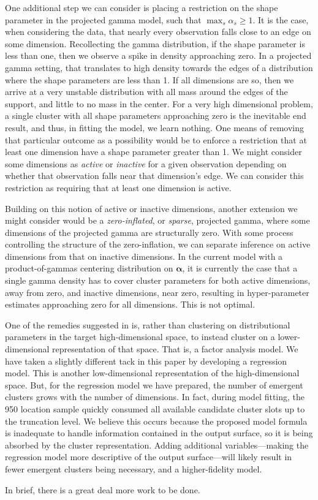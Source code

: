 One additional step we can consider is placing a restriction on the shape parameter in the projected
    gamma model, such that $\max_s \alpha_s \geq 1$.  It is the case, when considering the data, that
    nearly every observation falls close to an edge on some dimension.
    Recollecting the gamma distribution, if the shape 
    parameter is less than one, then we observe a spike in density approaching zero.  In a projected 
    gamma setting, that translates to high density towards the edges of a distribution 
    where the shape parameters are less than 1.  If all dimensions are so, then we arrive at a very 
    unstable distribution with all mass around the edges of the support, and little to no mass in the 
    center.  For a very high dimensional problem, a single cluster with all shape parameters
    approaching zero is the inevitable end result, and thus, in fitting the model, we learn nothing.
    One means of removing that particular outcome as a possibility would be to enforce a restriction 
    that at least one dimension have a shape parameter greater than 1. 
    We might consider some dimensions as \emph{active} or \emph{inactive} for a given observation
    depending on whether that observation falls near that dimension's edge.  We can consider this
    restriction as requiring that at least one dimension is active.

Building on this notion of active or inactive dimensions, another extension we might consider would be
    a \emph{zero-inflated}, or \emph{sparse}, projected gamma, where some dimensions of the projected 
    gamma are structurally zero.  With some process controlling the structure of the zero-inflation,
    we can separate inference on active dimensions from that on inactive dimensions.  In the current model
    with a product-of-gammas centering distribution on $\bm{\alpha}$, it is currently the case that a
    single gamma density has to cover cluster parameters for both active dimensions, away from zero, 
    and inactive dimensions, near zero, resulting in hyper-parameter estimates approaching zero for 
    all dimensions.  This is not optimal.

One of the remedies suggested in \cite{chandra2023} is, rather than clustering on distributional 
    parameters in the target high-dimensional space, to instead cluster on a lower-dimensional 
    representation of that space.  That is, a factor analysis model.  We have taken a slightly
    different tack in this paper by developing a regression model.  This is another low-dimensional
    representation of the high-dimensional space.  But, for the regression model we have prepared, 
    the number of emergent clusters grows with the number of dimensions.  In fact, during model fitting,
    the \num{950} location sample quickly consumed all available candidate cluster slots up to the
    truncation level. We believe this occurs because the proposed model formula is inadequate to handle
    information contained in the output surface, so it is being absorbed by the cluster representation.
    Adding additional variables---making the regression model more descriptive of the output 
    surface---will likely result in fewer emergent clusters being necessary, and a higher-fidelity model.

In brief, there is a great deal more work to be done.

